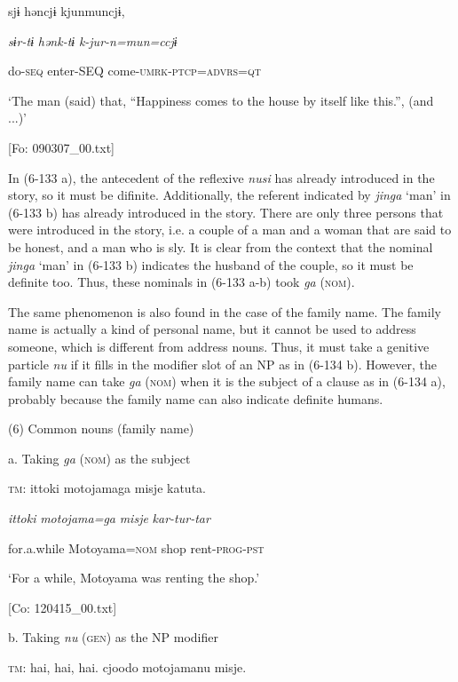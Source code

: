       sjɨ  həncjɨ  kjunmuncjɨ,

      \textit{sɨr-tɨ}  \textit{hənk-tɨ}  \textit{k-jur-n=mun=ccjɨ}

      do-\textsc{seq}  enter-SEQ  come-\textsc{umrk}-\textsc{ptcp}=\textsc{advrs}=\textsc{qt}

      ‘The man (said) that, “Happiness comes to the house by itself like this.”, (and ...)’

      [Fo: 090307\_00.txt]

In (6-133 a), the antecedent of the reflexive \textit{nusi} has already introduced in the story, so it must be difinite. Additionally, the referent indicated by \textit{jinga} ‘man’ in (6-133 b) has already introduced in the story. There are only three persons that were introduced in the story, i.e. a couple of a man and a woman that are said to be honest, and a man who is sly. It is clear from the context that the nominal \textit{jinga} ‘man’ in (6-133 b) indicates the husband of the couple, so it must be definite too. Thus, these nominals in (6-133 a-b) took \textit{ga} (\textsc{nom}).

The same phenomenon is also found in the case of the family name. The family name is actually a kind of personal name, but it cannot be used to address someone, which is different from address nouns. Thus, it must take a genitive particle \textit{nu} if it fills in the modifier slot of an NP as in (6-134 b). However, the family name can take \textit{ga} (\textsc{nom}) when it is the subject of a clause as in (6-134 a), probably because the family name can also indicate definite humans.

(6)  Common nouns (family name)

  a.  Taking \textit{ga} (\textsc{nom}) as the subject

    \textsc{tm}:  {\textbar}ittoki{\textbar}  motojamaga  misje  katuta.

      \textit{ittoki}  \textit{motojama=ga}  \textit{misje}  \textit{kar-tur-tar}

      for.a.while  Motoyama=\textsc{nom}  shop  rent-\textsc{prog}-\textsc{pst}

      ‘For a while, Motoyama was renting the shop.’

      [Co: 120415\_00.txt]

  b.  Taking \textit{nu} (\textsc{gen}) as the NP modifier

    \textsc{tm}:  {\textbar}hai,  hai,  hai{\textbar}.  cjoodo  motojamanu  misje.

